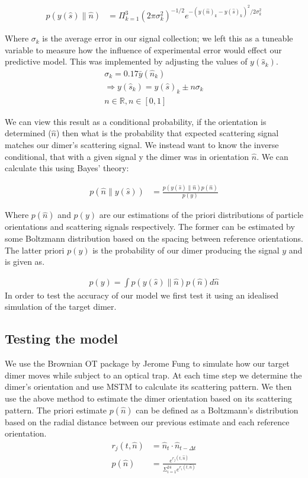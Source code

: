 \documentclass[11pt]{article}
\begin{document}
	\begin{align}
		p(y(\hat{s})\parallel\hat{n})&= \Pi^3_{k=1} 
		(2\pi\sigma_k^2)^{-1/2} e^{-(y(\hat{n})_k-y(\hat{s})_k)^2/2\sigma_k^2}
	\end{align}
	
	Where $\sigma_k$ is the average error in our signal collection; we left this as a tuneable variable to measure how the influence of experimental error would effect our predictive model. This was implemented by adjusting the values of $y(\hat{s}_k)$. 
	\begin{eqnarray*}
		\sigma_k = 0.17\bar{y}(\hat{n}_k) \\
		\Rightarrow y(\hat{s}_k) = y(\hat{s})_k \pm n\sigma_k \\ 
		n \in \mathbb{R}, n\in[0,1]
	\end{eqnarray*}
	
	We can view this result as a conditional probability, if the orientation is determined ($\hat{n}$) then what is the probability that expected scattering signal matches our dimer's scattering signal. We instead want to know the inverse conditional, that with a given signal y the dimer was in orientation $\hat{n}$. We can calculate this using Bayes' theory:
	
	\begin{align}
		p(\hat{n}\parallel y(\hat{s}))&= \frac{p(y(\hat{s})\parallel\hat{n})p(\hat{n})}{p(y)}
	\end{align}
	
	Where $p(\hat{n})$ and $p(y)$ are our estimations of the priori distributions of particle orientations and scattering signals respectively. The former can be estimated by some Boltzmann distribution based on the spacing between reference orientations. The latter priori $p(y)$ is the probability of our dimer producing the signal $y$ and is given as. 
	
	\begin{align}
		p(y) = \int p(y(\hat{s})\parallel \hat{n}) p(\hat{n}) d\hat{n}
	\end{align}
	In order to test the accuracy of our model we first test it using an idealised simulation of the target dimer. 
	
	\subsection*{Testing the model}
	We use the Brownian OT package by Jerome Fung \cite{Brownian_OT} to simulate how our target dimer moves while subject to an optical trap. At each time step we determine the dimer's orientation and use MSTM to calculate its scattering pattern. We then use the above method to estimate the dimer orientation based on its scattering pattern. The priori estimate $p(\hat{n})$ can be defined as a Boltzmann's distribution based on the radial distance between our previous estimate and each reference orientation. 
	\begin{align}
		r_j(t, \hat{n})&= \hat{n}_{t} \cdot \hat{n}_{t-\Delta t} \\
		p(\hat{n})&= \frac{e^{r_j(t,\hat{n})}}
		{\Sigma_{i=1}^{24}e^{r_i(t, \hat{n})}}
	\end{align}
	
\end{document}
